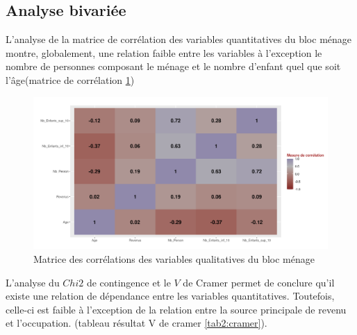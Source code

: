 \documentclass[11pt,a4paper, x11names]{article}\usepackage[]{graphicx}\usepackage[]{color}
\begin{document}
\subsection{Analyse bivariée}
L'analyse de la matrice de corrélation des variables quantitatives du bloc ménage montre, globalement, une relation faible entre les variables à l'exception le nombre de personnes composant le ménage et le nombre d'enfant quel que soit l'âge(matrice de corrélation \ref{fig2:cor})
\begin{figure}[H]
\includegraphics[scale=.6]{graphiques/corrplot.png}
\caption{Matrice des corrélations des variables qualitatives du bloc ménage} \label{fig2:cor}
\end{figure}
L'analyse du $Chi2$ de contingence et le $V$ de Cramer permet de conclure qu'il existe une relation de dépendance entre les variables quantitatives. Toutefois, celle-ci est faible à l'exception de la relation entre la source principale de revenu et l'occupation. (tableau résultat V de cramer \ref{tab2:cramer}).\par
\begin{table}[H]
\caption{Matrice des V de Cramer}
\label{tab2:cramer}
\end{table}
\end{document}
